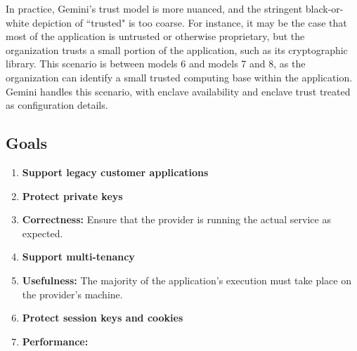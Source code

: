 
In practice, Gemini's trust model is more nuanced, and the stringent
black-or-white depiction of ``trusted" is too coarse.
%
For instance, it may be the case that most of the application is untrusted or
otherwise proprietary, but the organization trusts a small portion of the
application, such as its cryptographic library.
%
This scenario is between models 6 and models 7 and 8, as the organization can
identify a small trusted computing base within the application.
%
Gemini handles this scenario, with enclave availability and enclave trust
treated as configuration details.


\subsection{Goals}

\begin{enumerate}
    \item \textbf{Support legacy customer applications}
    \item \textbf{Protect private keys}
    \item \textbf{Correctness:} Ensure that the provider is running the actual
        service as expected.
    \item \textbf{Support multi-tenancy}
    \item \textbf{Usefulness:} The majority of the application's execution must
        take place on the provider's machine.

    \item \textbf{Protect session keys and cookies}

    \item \textbf{Performance:}
\end{enumerate}


%
